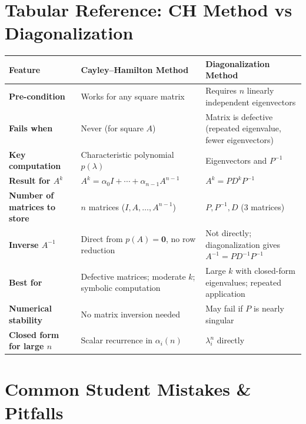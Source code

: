 \documentclass[12pt,a4paper]{article}
\begin{document}
\section{Tabular Reference: CH Method vs Diagonalization}

\begin{center}
\renewcommand{\arraystretch}{1.4}
\begin{tabular}{>{\bfseries}p{3.5cm} p{4.8cm} p{4.8cm}}
\toprule
Feature & Cayley--Hamilton Method & Diagonalization Method \\
\midrule
Pre-condition & Works for any square matrix & Requires \(n\) linearly independent eigenvectors \\
\addlinespace
Fails when & Never (for square \(A\)) & Matrix is defective (repeated eigenvalue, fewer eigenvectors) \\
\addlinespace
Key computation & Characteristic polynomial \(p(\lambda)\) & Eigenvectors and \(P^{-1}\) \\
\addlinespace
Result for \(A^k\) & \(A^k = \alpha_0 I + \cdots + \alpha_{n-1}A^{n-1}\) & \(A^k = PD^kP^{-1}\) \\
\addlinespace
Number of matrices to store & \(n\) matrices (\(I, A, \ldots, A^{n-1}\)) & \(P, P^{-1}, D\) (3 matrices) \\
\addlinespace
Inverse \(A^{-1}\) & Direct from \(p(A)=\mathbf{0}\), no row reduction & Not directly; diagonalization gives \(A^{-1}=PD^{-1}P^{-1}\) \\
\addlinespace
Best for & Defective matrices; moderate \(k\); symbolic computation & Large \(k\) with closed-form eigenvalues; repeated application \\
\addlinespace
Numerical stability & No matrix inversion needed & May fail if \(P\) is nearly singular \\
\addlinespace
Closed form for large \(n\) & Scalar recurrence in \(\alpha_i(n)\) & \(\lambda_i^n\) directly \\
\bottomrule
\end{tabular}
\end{center}

\section{Common Student Mistakes \& Pitfalls}
\end{document}
